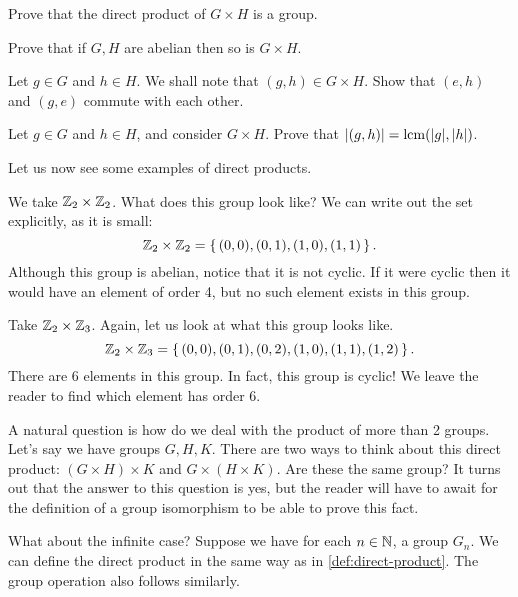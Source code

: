 \documentclass[./algebra-notes.tex]{subfiles}
\begin{document}
\begin{exercise}
    Prove that the direct product of $G \times H$ is a group.
\end{exercise}
\begin{exercise}
    Prove that if $G, H$ are abelian then so is $G \times H$.
\end{exercise}
\begin{exercise}
    Let $g \in G$ and $h \in H$. We shall note that $(g,h) \in G \times H$. Show
    that $(e, h)$ and $(g, e)$ commute with each other. 
\end{exercise}

\begin{exercise}
    Let $g \in G$ and $h \in H$, and consider $G \times H$. Prove that
    $\abs{(g,h)} = \operatorname{lcm}(\abs g, \abs h)$. 
\end{exercise}

Let us now see some examples of direct products.

\begin{example}
    We take $\mathbb{Z}_2 \times \mathbb{Z}_2$. What does this group look like? We can 
    write out the set explicitly, as it is small: 
    \[
        \mathbb{Z}_2 \times \mathbb{Z}_2 = \set{(0,0), (0,1), (1,0), (1,1)}.
    \]
    Although this group is abelian, notice that it is not cyclic. If it were
    cyclic then it would have an element of order 4, but no such element exists
    in this group.
\end{example}

\begin{example}
    Take $\mathbb{Z}_2 \times \mathbb{Z}_3$. Again, let us look at what this group looks like.
    \[
        \mathbb{Z}_2 \times \mathbb{Z}_3 = \set{(0,0), (0,1), (0,2), (1,0), (1,1), (1,2)}.
    \]
    There are 6 elements in this group. In fact, this group is cyclic! We leave
    the reader to find which element has order 6.
\end{example}

A natural question is how do we deal with the product of more than 2 groups.
Let's say we have groups $G, H, K$. There are two ways to think about this
direct product: $(G \times H) \times K$ and $G \times (H \times K)$. Are these
the same group? It turns out that the answer to this question is yes, but the
reader will have to await for the definition of a group isomorphism to be able
to prove this fact.

What about the infinite case? Suppose we have for each $n \in \mathbb{N}$, a group
$G_n$. We can define the direct product in the same way as in
\cref{def:direct-product}. The group operation also follows similarly.
\end{document}
